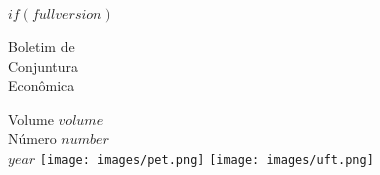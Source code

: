 \documentclass[twocolumn, a4paper, 10pt]{report}
\begin{document}
    $if(fullversion)$
    \onecolumn
    \begin{titlepage}
        \begin{flushleft}
            \color{white}
            \fontsize{50}{50}
            \selectfont
            Boletim de
            \\ Conjuntura
            \\ Econômica
        \end{flushleft}
        \vspace{\fill}
        \begin{flushleft}
            \color{white}
            {\Large Volume $volume$ \\[5pt] Número $number$}
            \\[1cm]
            \fontsize{50}{50}\selectfont
            $year$
            \hfill
            \texttt{[image: images/pet.png]}
            \texttt{[image: images/uft.png]}
        \end{flushleft}
        \end{titlepage}

    \newpage\null\thispagestyle{empty}\newpage\clearpage

\end{document}
